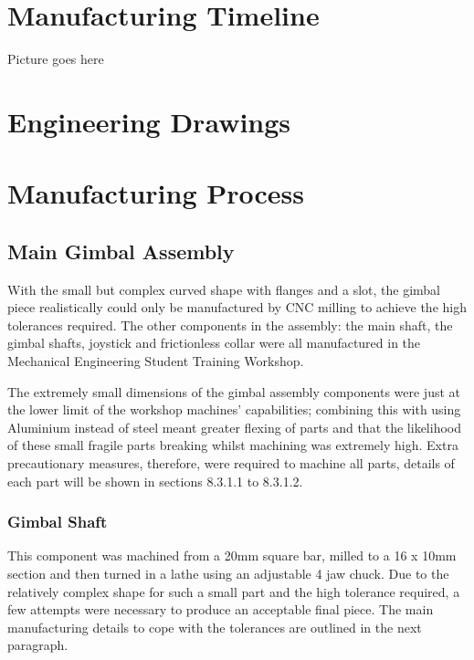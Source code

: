 
\section{Manufacturing Timeline} %
\label{sec:manufacturing_timeline}

Picture goes here


\section{Engineering Drawings} %
\label{sec:engineering_drawings}


\section{Manufacturing Process} %
\label{sec:manufacturing_process}

\subsection{Main Gimbal Assembly} %
\label{sub:main_gimbal_assembly}

With the small but complex curved shape with flanges and a slot, the gimbal piece realistically could only be manufactured by CNC milling to achieve the high tolerances required. The other components in the assembly: the main shaft, the gimbal shafts, joystick and frictionless collar were all manufactured in the Mechanical Engineering Student Training Workshop.

The extremely small dimensions of the gimbal assembly components were just at the lower limit of the workshop machines' capabilities; combining this with using Aluminium instead of steel meant greater flexing of parts and that the likelihood of these small fragile parts breaking whilst machining was extremely high. Extra precautionary measures, therefore, were required to machine all parts, details of each part will be shown in sections 8.3.1.1 to 8.3.1.2.


\subsubsection{Gimbal Shaft} %
\label{par:gimbal_shaft}

This component was machined from a 20mm square bar, milled to a 16 x 10mm section and then turned in a lathe using an adjustable 4 jaw chuck. Due to the relatively complex shape for such a small part and the high tolerance required, a few attempts were necessary to produce an acceptable final piece. The main manufacturing details to cope with the tolerances are outlined in the next paragraph.

